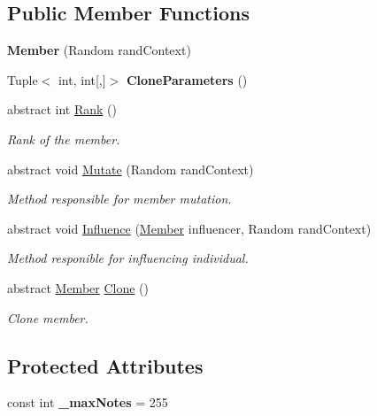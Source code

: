 \subsection*{Public Member Functions}
\begin{DoxyCompactItemize}
\item 
\hypertarget{class_music_population_1_1_member_ac82cc845ee466649dc698f60a20043c9}{{\bfseries Member} (Random rand\+Context)}\label{class_music_population_1_1_member_ac82cc845ee466649dc698f60a20043c9}

\item 
\hypertarget{class_music_population_1_1_member_a240df0f16bc7879f56f50d4eb00352b5}{Tuple$<$ int, int\mbox{[},\mbox{]}$>$ {\bfseries Clone\+Parameters} ()}\label{class_music_population_1_1_member_a240df0f16bc7879f56f50d4eb00352b5}

\item 
abstract int \hyperlink{class_music_population_1_1_member_a238549ad669c4f8eda036e608beba422}{Rank} ()
\begin{DoxyCompactList}\small\item\em Rank of the member. \end{DoxyCompactList}\item 
abstract void \hyperlink{class_music_population_1_1_member_affe5eeed6ac4b042d5729991f0c39eba}{Mutate} (Random rand\+Context)
\begin{DoxyCompactList}\small\item\em Method responsible for member mutation. \end{DoxyCompactList}\item 
abstract void \hyperlink{class_music_population_1_1_member_a99042d0181ef0e48ad71d45313a176b6}{Influence} (\hyperlink{class_music_population_1_1_member}{Member} influencer, Random rand\+Context)
\begin{DoxyCompactList}\small\item\em Method responible for influencing individual. \end{DoxyCompactList}\item 
abstract \hyperlink{class_music_population_1_1_member}{Member} \hyperlink{class_music_population_1_1_member_af310ebdf342531da3edc882987574a16}{Clone} ()
\begin{DoxyCompactList}\small\item\em Clone member. \end{DoxyCompactList}\end{DoxyCompactItemize}
\subsection*{Protected Attributes}
\begin{DoxyCompactItemize}
\item 
\hypertarget{class_music_population_1_1_member_a2224ee5f8d0c6be59f85fd4e12f62741}{const int {\bfseries \+\_\+max\+Notes} = 255}\label{class_music_population_1_1_member_a2224ee5f8d0c6be59f85fd4e12f62741}

\end{DoxyCompactItemize}

